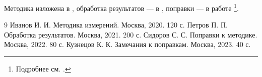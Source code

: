 Методика изложена в \cite{ivanov}, обработка результатов — в \cite{petrov},
поправки — в работе \emph{\cite{sidorov}}\footnote{Подробнее см. \cite{kuznetsov}.}.

\begin{thebibliography}{9}
   Иванов И. И. Методика измерений. Москва, 2020. 120 с.
   Петров П. П. Обработка результатов. Москва, 2021. 200 с.
   Сидоров С. С. Поправки к методике. Москва, 2022. 80 с.
   Кузнецов К. К. Замечания к поправкам. Москва, 2023. 40 с.
\end{thebibliography}
